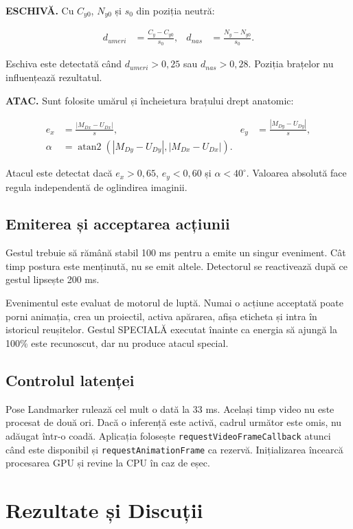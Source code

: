 \documentclass[12pt, a4paper]{article}
\begin{document}
\textbf{ESCHIVĂ.} Cu $C_{y0}$, $N_{y0}$ și $s_0$ din poziția neutră:

\begin{align}
d_{umeri} &= \frac{C_y-C_{y0}}{s_0}, &
d_{nas} &= \frac{N_y-N_{y0}}{s_0}.
\end{align}

Eschiva este detectată când $d_{umeri}>0{,}25$ sau $d_{nas}>0{,}28$. Poziția
brațelor nu influențează rezultatul.

\textbf{ATAC.} Sunt folosite umărul și încheietura brațului drept anatomic:

\begin{align}
e_x &= \frac{|M_{Dx}-U_{Dx}|}{s}, &
e_y &= \frac{|M_{Dy}-U_{Dy}|}{s}, \\
\alpha &= \operatorname{atan2}(|M_{Dy}-U_{Dy}|,|M_{Dx}-U_{Dx}|).
\end{align}

Atacul este detectat dacă $e_x>0{,}65$, $e_y<0{,}60$ și $\alpha<40^\circ$.
Valoarea absolută face regula independentă de oglindirea imaginii.

\subsection{Emiterea și acceptarea acțiunii}

Gestul trebuie să rămână stabil 100 ms pentru a emite un singur eveniment. Cât timp
postura este menținută, nu se emit altele. Detectorul se reactivează după ce gestul
lipsește 200 ms.

Evenimentul este evaluat de motorul de luptă. Numai o acțiune acceptată poate porni
animația, crea un proiectil, activa apărarea, afișa eticheta și intra în istoricul
reușitelor. Gestul SPECIALĂ executat înainte ca energia să ajungă la 100\% este
recunoscut, dar nu produce atacul special.

\subsection{Controlul latenței}

Pose Landmarker rulează cel mult o dată la 33 ms. Același timp video nu este procesat
de două ori. Dacă o inferență este activă, cadrul următor este omis, nu adăugat într-o
coadă. Aplicația folosește \texttt{requestVideoFrameCallback} atunci când este
disponibil și \texttt{requestAnimationFrame} ca rezervă. Inițializarea încearcă
procesarea GPU și revine la CPU în caz de eșec.

\section{Rezultate și Discuții}
\end{document}
